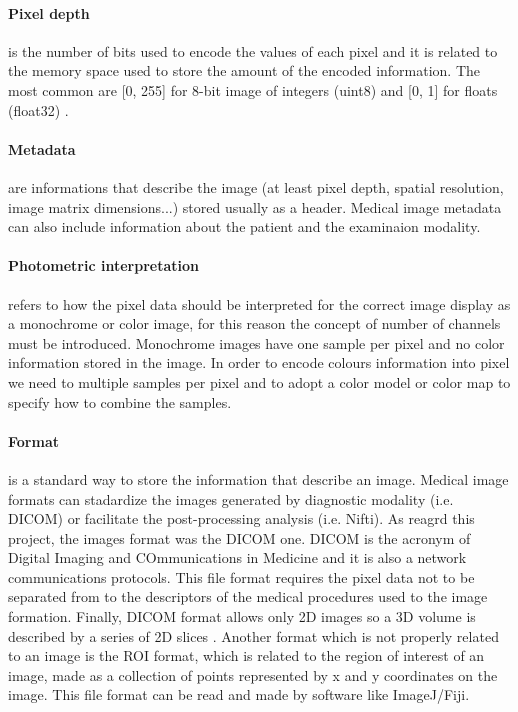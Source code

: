 \documentclass[12pt,a4paper]{report}
\begin{document}
\paragraph{Pixel depth} is the number of bits used to encode the values of each pixel and it is related to the memory space used to store the amount of the encoded information. The most common are [0, 255] for 8-bit image of integers (uint8) and [0, 1] for floats (float32) \cite{Biondi,Larobina}.

\paragraph{Metadata} are informations that describe the image (at least pixel depth, spatial resolution, image matrix dimensions...) stored usually as a header. Medical image metadata can also include information about the patient and the examinaion modality\cite{Biondi,Larobina}.

\paragraph{Photometric interpretation} refers to how the pixel data should be interpreted for the correct image display as a monochrome or color image, for this reason the concept of number of channels must be introduced. Monochrome images have one sample per pixel and no color information stored in the image. In order to encode colours information into pixel we need to multiple samples per pixel and to adopt a color model or color map to specify how to combine the samples\cite{Biondi,Larobina}.

\paragraph{Format} is a standard way to store the information that describe an image. Medical image formats can stadardize the images generated by diagnostic modality (i.e. DICOM) or facilitate the post-processing analysis (i.e. Nifti). As reagrd this project, the images format was the DICOM one. DICOM is the acronym of Digital Imaging and COmmunications in Medicine and it is also a network communications protocols. This file format requires the pixel data not to be separated from to the descriptors of the medical procedures used to the image formation. Finally, DICOM format allows only 2D images so a 3D volume is described by a series of 2D slices \cite{Biondi,Larobina}. Another format which is not properly related to an image is the ROI format, which is related to the region of interest of an image, made as a collection of points represented by x and y coordinates on the image. This file format can be read and made by software like ImageJ/Fiji\cite{Fiji}.
\end{document}
